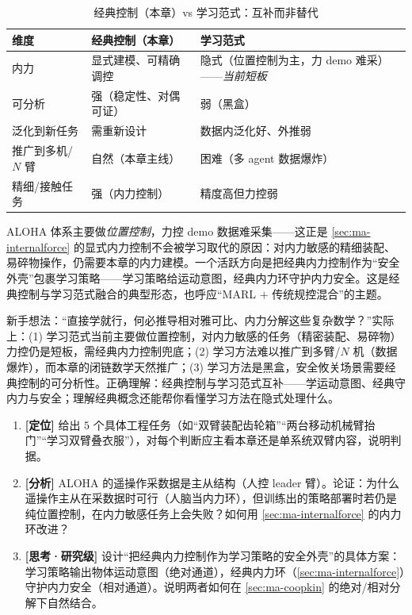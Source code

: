 \begin{table}[H]\centering\small
\caption{经典控制（本章）vs 学习范式：互补而非替代}
\label{tab:ma-classic-vs-learning}
\begin{tabular}{lll}
\toprule
维度 & 经典控制（本章） & 学习范式 \\
\midrule
内力 & 显式建模、可精确调控 & 隐式（位置控制为主，力 demo 难采）——\emph{当前短板} \\
可分析 & 强（稳定性、对偶可证） & 弱（黑盒） \\
泛化到新任务 & 需重新设计 & 数据内泛化好、外推弱 \\
推广到多机/$N$ 臂 & 自然（本章主线） & 困难（多 agent 数据爆炸） \\
精细/接触任务 & 强（内力控制） & 精度高但力控弱 \\
\bottomrule
\end{tabular}
\end{table}

\begin{insight}[显式内力控制不会被学习取代]
ALOHA 体系主要做\emph{位置控制}，力控 demo 数据难采集——这正是 \cref{sec:ma-internalforce} 的显式内力控制不会被学习取代的原因：对内力敏感的精细装配、易碎物操作，仍需要本章的内力建模。一个活跃方向是把经典内力控制作为“安全外壳”包裹学习策略——学习策略给运动意图，经典内力环守护内力安全。这是经典控制与学习范式融合的典型形态，也呼应“MARL $+$ 传统规控混合”的主题。
\end{insight}

\begin{pitfall}
新手想法：“直接学就行，何必推导相对雅可比、内力分解这些复杂数学？”实际上：(1) 学习范式当前主要做位置控制，对内力敏感的任务（精密装配、易碎物）力控仍是短板，需经典内力控制兜底；(2) 学习方法难以推广到多臂/$N$ 机（数据爆炸），而本章的闭链数学天然推广；(3) 学习方法是黑盒，安全攸关场景需要经典控制的可分析性。正确理解：经典控制与学习范式互补——学运动意图、经典守内力与安全；理解经典概念还能帮你看懂学习方法在隐式处理什么。
\end{pitfall}

\begin{exercise}
\begin{enumerate}
  \item \textbf{[定位]} 给出 $5$ 个具体工程任务（如“双臂装配齿轮箱”“两台移动机械臂抬门”“学习双臂叠衣服”），对每个判断应主看本章还是单系统双臂内容，说明判据。
  \item \textbf{[分析]} ALOHA 的遥操作采数据是主从结构（人控 leader 臂）。论证：为什么遥操作主从在采数据时可行（人脑当内力环），但训练出的策略部署时若仍是纯位置控制，在内力敏感任务上会失败？如何用 \cref{sec:ma-internalforce} 的内力环改进？
  \item \textbf{[思考·研究级]} 设计“把经典内力控制作为学习策略的安全外壳”的具体方案：学习策略输出物体运动意图（绝对通道），经典内力环（\cref{sec:ma-internalforce}）守护内力安全（相对通道）。说明两者如何在 \cref{sec:ma-coopkin} 的绝对/相对分解下自然结合。
\end{enumerate}
\end{exercise}

